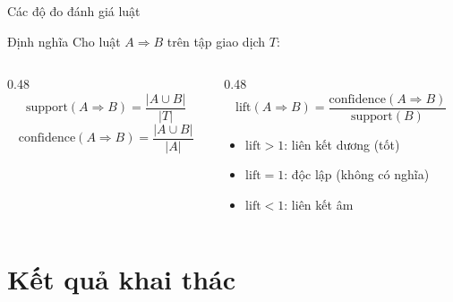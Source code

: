 \documentclass[aspectratio=169]{beamer}
\begin{document}
\begin{frame}{Các độ đo đánh giá luật}
  \begin{block}{Định nghĩa}
    Cho luật $A \Rightarrow B$ trên tập giao dịch $T$:
  \end{block}
  \vspace{0.3em}
  \begin{columns}[T]
    \begin{column}{0.48\textwidth}
      \[
        \mathrm{support}(A \Rightarrow B) = \frac{|A \cup B|}{|T|}
      \]
      \[
        \mathrm{confidence}(A \Rightarrow B) = \frac{|A \cup B|}{|A|}
      \]
    \end{column}
    \begin{column}{0.48\textwidth}
      \[
        \mathrm{lift}(A \Rightarrow B) = \frac{\mathrm{confidence}(A \Rightarrow B)}{\mathrm{support}(B)}
      \]
      \begin{itemize}
        \item $\mathrm{lift} > 1$: liên kết dương (tốt)
        \item $\mathrm{lift} = 1$: độc lập (không có nghĩa)
        \item $\mathrm{lift} < 1$: liên kết âm
      \end{itemize}
    \end{column}
  \end{columns}
\end{frame}

\section{Kết quả khai thác}
\end{document}
